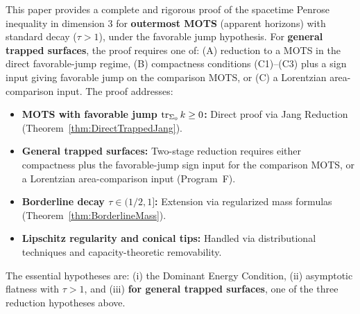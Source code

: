 \begin{remark}
This paper provides a complete and rigorous proof of the spacetime Penrose inequality in dimension 3 for \textbf{outermost MOTS} (apparent horizons) with standard decay ($\tau > 1$), under the favorable jump hypothesis. For \textbf{general trapped surfaces}, the proof requires one of: (A) reduction to a MOTS in the direct favorable-jump regime, (B) compactness conditions (C1)--(C3) plus a sign input giving favorable jump on the comparison MOTS, or (C) a Lorentzian area-comparison input. The proof addresses:
\begin{itemize}
    \item \textbf{MOTS with favorable jump $\operatorname{tr}_{\Sigma_0} k \ge 0$:} Direct proof via Jang Reduction (Theorem~\ref{thm:DirectTrappedJang}).
    \item \textbf{General trapped surfaces:} Two-stage reduction requires either compactness plus the favorable-jump sign input for the comparison MOTS, or a Lorentzian area-comparison input (Program~F).
    \item \textbf{Borderline decay $\tau \in (1/2, 1]$:} Extension via regularized mass formulas (Theorem~\ref{thm:BorderlineMass}).
    \item \textbf{Lipschitz regularity and conical tips:} Handled via distributional techniques and capacity-theoretic removability.
\end{itemize}
The essential hypotheses are: (i) the Dominant Energy Condition, (ii) asymptotic flatness with $\tau > 1$, and (iii) \textbf{for general trapped surfaces}, one of the three reduction hypotheses above.
\end{remark}

